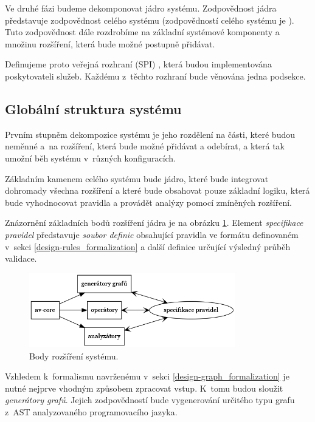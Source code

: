 Ve druhé fázi budeme dekomponovat jádro systému. Zodpovědnost jádra představuje zodpovědnost celého systému (zodpovědností celého systému je ). Tuto zodpovědnost dále rozdrobíme na základní systémové komponenty a množinu rozšíření, která bude možné postupně přidávat.

Definujeme proto veřejná rozhraní (SPI) \cite{spi}, která budou implementována poskytovateli služeb. Každému z~těchto rozhraní bude věnována jedna podsekce.

\subsection{Globální struktura systému}

Prvním stupněm dekompozice systému je jeho rozdělení na části, které budou neměnné a~na rozšíření, která bude možné přidávat a odebírat, a která tak umožní běh systému v~různých konfiguracích.

Základním kamenem celého systému bude jádro, které bude integrovat dohromady všechna rozšíření a které bude obsahovat pouze základní logiku, která bude vyhodnocovat pravidla a provádět analýzy pomocí zmíněných rozšíření.

Znázornění základních bodů rozšíření jádra je na obrázku \ref{design-system_extensions}. Element \emph{specifikace pravidel} představuje \emph{soubor definic} obsahující pravidla ve formátu definovaném v~sekci \ref{design-rules_formalization} a další definice určující výsledný průběh validace.

\begin{figure}[h!]
  \centering
  \includegraphics[width=0.8\textwidth]{./graphs/system_extensions.png}
  \caption{Body rozšíření systému.\label{design-system_extensions}}
\end{figure}

Vzhledem k~formalismu navrženému v~sekci \ref{design-graph_formalization} je nutné nejprve vhodným způsobem zpracovat vstup. K~tomu budou sloužit \emph{generátory grafů}. Jejich zodpovědností bude vygenerování určitého typu grafu z~AST analyzovaného programovacího jazyka.

